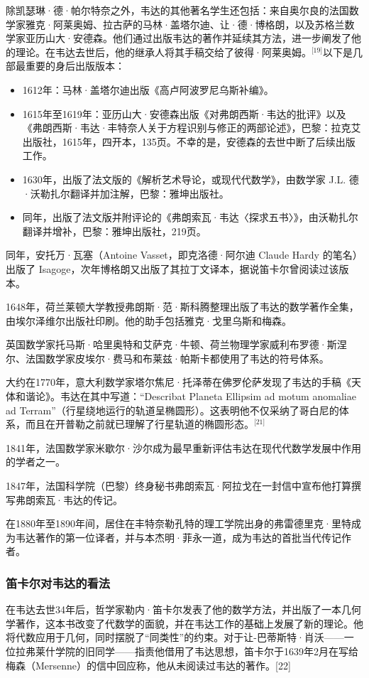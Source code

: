 除凯瑟琳·德·帕尔特奈之外，韦达的其他著名学生还包括：来自奥尔良的法国数学家雅克·阿莱奥姆、拉古萨的马林·盖塔尔迪、让·德·博格朗，以及苏格兰数学家亚历山大·安德森。他们通过出版韦达的著作并延续其方法，进一步阐发了他的理论。在韦达去世后，他的继承人将其手稿交给了彼得·阿莱奥姆。\(^\text{[19]}\)以下是几部最重要的身后出版版本：
\begin{itemize}
\item 1612年：马林·盖塔尔迪出版《高卢阿波罗尼乌斯补编》。
\item 1615年至1619年：亚历山大·安德森出版《对弗朗西斯·韦达的批评》以及《弗朗西斯·韦达·丰特奈人关于方程识别与修正的两部论述》，巴黎：拉克艾出版社，1615年，四开本，135页。不幸的是，安德森的去世中断了后续出版工作。
\item 1630年，出版了法文版的《解析艺术导论，或现代代数学》，由数学家 J.L. 德·沃勒扎尔翻译并加注解，巴黎：雅坤出版社。
\item 同年，出版了法文版并附评论的《弗朗索瓦·韦达〈探求五书〉》，由沃勒扎尔翻译并增补，巴黎：雅坤出版社，219页。
\end{itemize}
同年，安托万·瓦塞（Antoine Vasset，即克洛德·阿尔迪 Claude Hardy 的笔名）出版了 Isagoge，次年博格朗又出版了其拉丁文译本，据说笛卡尔曾阅读过该版本。

1648年，荷兰莱顿大学教授弗朗斯·范·斯科腾整理出版了韦达的数学著作全集，由埃尔泽维尔出版社印刷。他的助手包括雅克·戈里乌斯和梅森。

英国数学家托马斯·哈里奥特和艾萨克·牛顿、荷兰物理学家威利布罗德·斯涅尔、法国数学家皮埃尔·费马和布莱兹·帕斯卡都使用了韦达的符号体系。

大约在1770年，意大利数学家塔尔焦尼·托泽蒂在佛罗伦萨发现了韦达的手稿《天体和谐论》。韦达在其中写道：“Describat Planeta Ellipsim ad motum anomaliae ad Terram”（行星绕地运行的轨道呈椭圆形）。这表明他不仅采纳了哥白尼的体系，而且在开普勒之前就已理解了行星轨道的椭圆形态。\(^\text{[21]}\)

1841年，法国数学家米歇尔·沙尔成为最早重新评估韦达在现代代数学发展中作用的学者之一。

1847年，法国科学院（巴黎）终身秘书弗朗索瓦·阿拉戈在一封信中宣布他打算撰写弗朗索瓦·韦达的传记。

在1880年至1890年间，居住在丰特奈勒孔特的理工学院出身的弗雷德里克·里特成为韦达著作的第一位译者，并与本杰明·菲永一道，成为韦达的首批当代传记作者。
\subsubsection{笛卡尔对韦达的看法}
在韦达去世34年后，哲学家勒内·笛卡尔发表了他的数学方法，并出版了一本几何学著作，这本书改变了代数学的面貌，并在韦达工作的基础上发展了新的理论。他将代数应用于几何，同时摆脱了“同类性”的约束。对于让-巴蒂斯特·肖沃——一位拉弗莱什学院的旧同学——指责他借用了韦达思想，笛卡尔于1639年2月在写给梅森（Mersenne）的信中回应称，他从未阅读过韦达的著作。[22]

